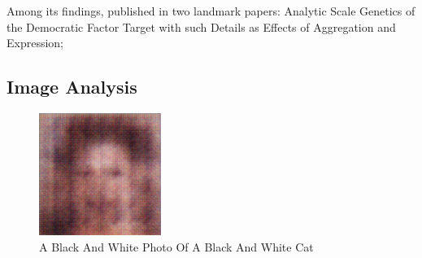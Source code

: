 \documentclass{article}%
\begin{document}
Among its findings, published in two landmark papers: Analytic Scale Genetics of the Democratic Factor Target with such Details as Effects of Aggregation and Expression;

%
\subsection{Image Analysis}%
\label{subsec:ImageAnalysis}%


\begin{figure}[h!]%
\centering%
\includegraphics[width=150px]{500_fake_images/samples_5_129.png}%
\caption{A Black And White Photo Of A Black And White Cat}%
\end{figure}

%
\end{document}
